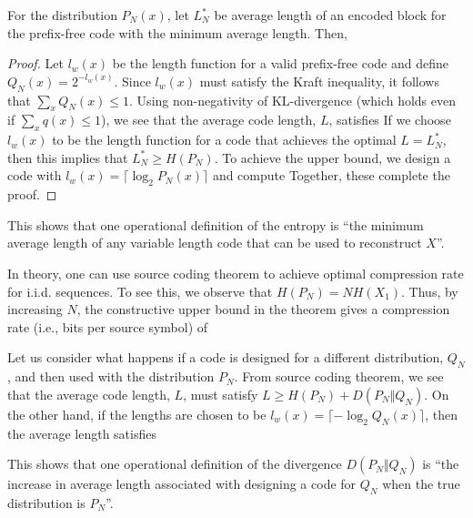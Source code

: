 \documentclass[letterpaper,10pt,english]{article}
\begin{document}
\begin{thm} 
For the distribution $P_N(x)$, let $L_N^{\ast}$ be average length of an encoded block for the prefix-free code with the minimum average length. 
Then,
\end{thm} 
\begin{proof} 
Let $l_w(x)$ be the length function for a valid prefix-free code and define $Q_N(x) = 2^{-l_w(x)}$. 
Since $l_w(x)$ must satisfy the Kraft inequality, it follows that $\sum_x Q_N(x) \le 1$. 
Using non-negativity of KL-divergence (which holds even if $\sum_x q(x) \le 1$), 
we see that the average code length, $L$, satisfies
If we choose $l_w(x)$ to be the length function for a code that achieves the optimal $L = L^{\ast}_N$, then this implies that $L^{\ast}_N \ge H (P_N)$. 
To achieve the upper bound, we design a code with $l_w (x) = \lceil \log_2 P_N (x)\rceil$ and compute
Together, these complete the proof.
\end{proof} 
\begin{rem}
This shows that one operational definition of the entropy is ``the minimum average length of any variable length code that can be used to reconstruct $X$''. 
\end{rem} 
\begin{rem}
In theory, one can use source coding theorem to achieve optimal compression rate for i.i.d. sequences. 
To see this, we observe that $H(P_N) = NH(X_1)$. 
Thus, by increasing $N$, the constructive upper bound in the theorem gives a compression rate (i.e., bits per source symbol) of
\end{rem} 

\begin{shaded*}\begin{exmp} 
Let us consider what happens if a code is designed for a different distribution, $Q_N$, and then used with the distribution $P_N$. From source coding theorem, we see that the average code length, $L$, must satisfy $L \ge H(P_N ) + D (P_N \Vert Q_N)$. 
On the other hand, if the lengths are chosen to be $l_w (x) = \lceil -\log_2 Q_N (x)\rceil$, 
then the average length satisfies 
\end{exmp}\end{shaded*} 
\begin{rem}
This shows that one operational definition of the divergence $D (P_N \Vert Q_N )$ is ``the increase in average length associated with designing a code for $Q_N$ when the true distribution is $P_N$''.
\end{rem}  
  
\end{document}
